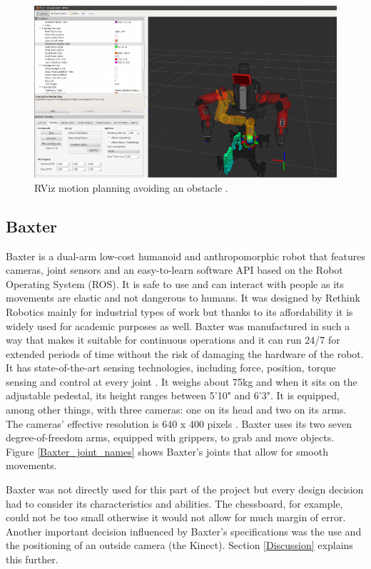 \documentclass{l4proj}
\begin{document}
\begin{figure}[h!]
\centering
\includegraphics[scale=0.53]{RViz.png}
\caption{RViz motion planning avoiding an obstacle \cite{RViz}.}
\label{RViz}
\end{figure}
\vspace{100mm}

\subsection{Baxter} \label{Baxter}

Baxter is a dual-arm low-cost humanoid and anthropomorphic robot that features cameras, joint sensors and an easy-to-learn software API based on the Robot Operating System (ROS). It is safe to use and can interact with people as its movements are elastic and not dangerous to humans. It was designed by Rethink Robotics mainly for industrial types of work but thanks to its affordability it is widely used for academic purposes as well. Baxter was manufactured in such a way that makes it suitable for continuous operations and it can run 24/7 for extended periods of time without the risk of damaging the hardware of the robot. It has state-of-the-art sensing technologies, including force, position, torque sensing and control at every joint \cite{BaxterSpecs}.
It weighs about 75kg and when it sits on the adjustable pedestal, its height ranges between 5'10" and 6'3". It is equipped, among other things, with three cameras: one on its head and two on its arms. The cameras' effective resolution is 640 x 400 pixels \cite{BaxterPhysicSpecs}. Baxter uses its two seven degree-of-freedom arms, equipped with grippers, to grab and move objects. Figure \ref{Baxter_joint_names} shows Baxter's joints that allow for smooth movements.

Baxter was not directly used for this part of the project but every design decision had to consider its characteristics and abilities. The chessboard, for example, could not be too small otherwise it would not allow for much margin of error. Another important decision influenced by Baxter's specifications was the use and the positioning of an outside camera (the Kinect). Section \ref{Discussion} explains this further.
\end{document}
